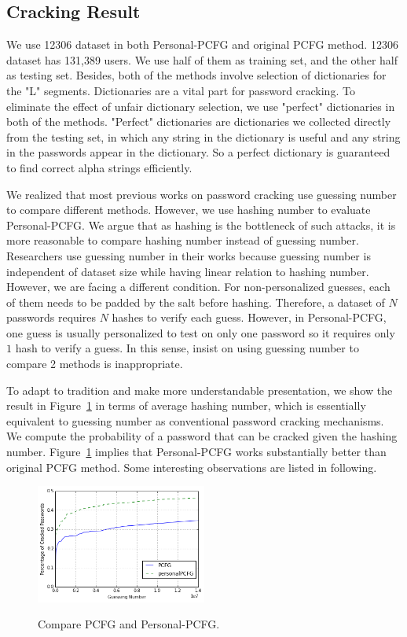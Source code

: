 \subsection{Cracking Result}
We use 12306 dataset in both Personal-PCFG and original PCFG method. 12306 dataset has 131,389 users. We use half of them as training set, and the other half as testing set. Besides, both of the methods involve selection of dictionaries for the "L" segments. Dictionaries are a vital part for password cracking. To eliminate the effect of unfair dictionary selection, we use "perfect" dictionaries in both of the methods. "Perfect" dictionaries are dictionaries we collected directly from the testing set, in which any string in the dictionary is useful and any string in the passwords appear in the dictionary. So a perfect dictionary is guaranteed to find correct alpha strings efficiently.

We realized that most previous works on password cracking use guessing number to compare different methods. However, we use hashing number to evaluate Personal-PCFG. We argue that as hashing is the bottleneck of such attacks, it is more reasonable to compare hashing number instead of guessing number. Researchers use guessing number in their works because guessing number is independent of dataset size while having linear relation to hashing number. However, we are facing a different condition. For non-personalized guesses, each of them needs to be padded by the salt before hashing. Therefore, a dataset of $N$ passwords requires $N$ hashes to verify each guess. However, in Personal-PCFG, one guess is usually personalized to test on only one password so it requires only $1$ hash to verify a guess. In this sense, insist on using guessing number to compare 2 methods is inappropriate.

To adapt to tradition and make more understandable presentation, we show the result in Figure~\ref{f3} in terms of average hashing number, which is essentially equivalent to guessing number as conventional password cracking mechanisms. We compute the probability of a password that can be cracked given the hashing number. Figure~\ref{f3} implies that Personal-PCFG works substantially better than original PCFG method. Some interesting observations are listed in following.

\begin{figure}[h!]
\centering
  \caption{Compare PCFG and Personal-PCFG.}{}
  \label{f3}
  \centering
    \includegraphics[width=0.5\textwidth]{fig/cmp}
\end{figure}

